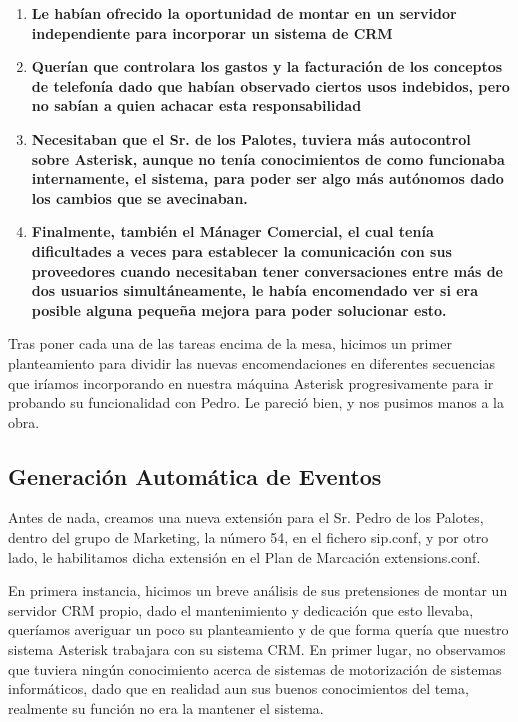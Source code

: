 \begin{enumerate}

\item \textbf{Le habían ofrecido la oportunidad de montar en un servidor independiente para incorporar un sistema de CRM}
\item \textbf{Querían que controlara los gastos y la facturación de los conceptos de telefonía dado que habían observado ciertos usos indebidos, pero no sabían a quien achacar esta responsabilidad}
\item \textbf{Necesitaban que el Sr. de los Palotes, tuviera más autocontrol sobre Asterisk, aunque no tenía conocimientos de como funcionaba internamente, el sistema, para poder ser algo más autónomos dado los cambios que se avecinaban.}
\item \textbf{Finalmente, también el Mánager Comercial, el cual tenía dificultades a veces para establecer la comunicación con sus proveedores cuando necesitaban tener conversaciones entre más de dos usuarios simultáneamente, le había encomendado ver si era posible alguna pequeña mejora para poder solucionar esto.}

\end{enumerate}

Tras poner cada una de las tareas encima de la mesa, hicimos un primer planteamiento para dividir las nuevas encomendaciones en diferentes secuencias que iríamos incorporando en nuestra máquina Asterisk progresivamente para ir probando su funcionalidad con Pedro. Le pareció bien, y nos pusimos manos a la obra.

\subsection{Generación Automática de Eventos}

Antes de nada, creamos una nueva extensión para el Sr. Pedro de los Palotes, dentro del grupo de Marketing, la número 54, en el fichero sip.conf, y por otro lado, le habilitamos dicha extensión en el Plan de Marcación extensions.conf.

En primera instancia, hicimos un breve análisis de sus pretensiones de montar un servidor CRM propio, dado el mantenimiento y dedicación que esto llevaba, queríamos averiguar un poco su planteamiento y de que forma quería que nuestro sistema Asterisk trabajara con su sistema CRM. En primer lugar, no observamos que tuviera ningún conocimiento acerca de sistemas de motorización de sistemas informáticos, dado que en realidad aun sus buenos conocimientos del tema, realmente su función no era la mantener el sistema. 

